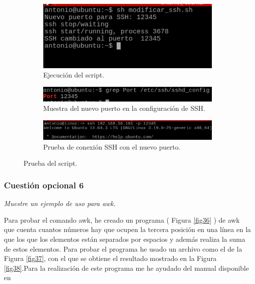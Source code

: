 \begin{figure}[H]
    \centering
    \begin{subfigure}[b]{0.72\textwidth}
        \includegraphics[width=\textwidth]{imagenes/img51}
        \caption{Ejecución del script.} 
    \end{subfigure}
   \begin{subfigure}[b]{0.8\textwidth}
        \includegraphics[width=\textwidth]{imagenes/img52}
        \caption{Muestra del nuevo puerto en la configuración de SSH.} 
    \end{subfigure}
    \begin{subfigure}[b]{0.8\textwidth}
        \includegraphics[width=\textwidth]{imagenes/img53}
        \caption{Prueba de conexión SSH con el nuevo puerto.} 
    \end{subfigure}
    \caption{Prueba del script.}  
    \label{fig48} 
\end{figure}
\subsubsection{Cuestión opcional 6}
\textit{Muestre un ejemplo de uso para awk.}
\newline

Para probar el comando awk, he creado un programa ( Figura \ref{fig36} ) de awk que cuenta cuantos números hay que ocupen la tercera posición en una línea en la que los que los elementos están separados por espacios y además realiza la suma de estos elementos. Para probar el programa he usado un archivo como el de la Figura \ref{fig37}, con el que se obtiene el resultado mostrado en la Figura \ref{fig38}.Para la realización de este programa me he ayudado del manual disponible en \cite{awk}


